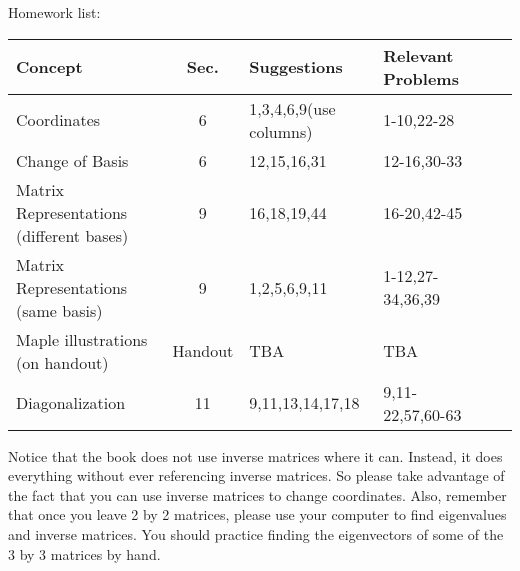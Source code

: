 \documentclass[10pt]{article}
\theoremstyle{plain}
\theoremstyle{box}
\begin{document}
Homework list:
\begin{center}
\begin{tabular}{|l|c|l|l|l|l|}
\hline
Concept&Sec.&Suggestions&Relevant Problems\\ \hline
Coordinates&6&1,3,4,6,9(use columns)&1-10,22-28\\ \hline
Change of Basis &6&12,15,16,31&12-16,30-33\\ \hline
Matrix Representations (different bases)&9&16,18,19,44&16-20,42-45\\ \hline
Matrix Representations (same basis)&9&1,2,5,6,9,11&1-12,27-34,36,39\\ \hline
Maple illustrations (on handout)&Handout&TBA&TBA\\ \hline
Diagonalization&11&9,11,13,14,17,18&9,11-22,57,60-63\\ \hline
\end{tabular}
\end{center}
Notice that the book does not use inverse matrices where it can.  Instead, it does everything without ever referencing inverse matrices. So please take advantage of the fact that you can use inverse matrices to change coordinates.  Also, remember that once you leave 2 by 2 matrices, please use your computer to find eigenvalues and inverse matrices.  You should practice finding the eigenvectors of some of the 3 by 3 matrices by hand.
\end{document}

